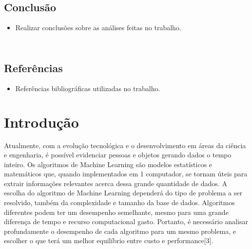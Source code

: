 \documentclass{article}
\begin{document}
\subsection*{\\[30pt] Conclusão}
\begin{itemize}
    \item Realizar conclusões sobre as análises feitas no trabalho.
\end{itemize}

\subsection*{\\[30pt] Referências}
\begin{itemize}
    \item Referências bibliográficas utilizadas no trabalho.
\end{itemize}

\newpage






\section*{Introdução}

\vspace{15pt}

Atualmente, com a evolução tecnológica e o desenvolvimento em áreas da ciência e engenharia, é possível evidenciar pessoas e objetos gerando dados o tempo inteiro. Os algoritmos de Machine Learning são modelos estatísticos e matemáticos que, quando implementados em 1 computador, se tornam úteis para extrair informações relevantes acerca dessa grande quantidade de dados. A escolha do algoritmo de Machine Learning dependerá do tipo de problema a ser resolvido, também da complexidade e tamanho da base de dados. Algoritmos diferentes podem ter um desempenho semelhante, mesmo para uma grande diferença de tempo e recurso computacional gasto. Portanto, é necessário analisar profundamente o desempenho de cada algoritmo para um mesmo problema, e escolher o que terá um melhor equilíbrio entre custo e performance[3].



\vspace{15pt}
\end{document}
